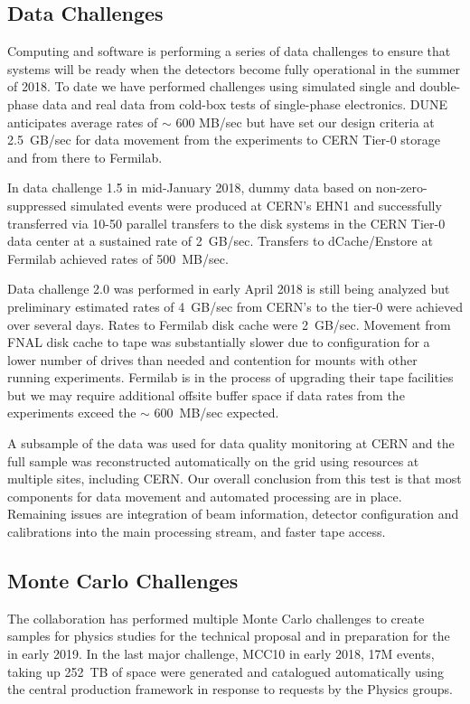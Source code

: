 \subsection{Data Challenges}

Computing and software is performing a series of data challenges to ensure that systems will be ready when the detectors become fully operational in the summer of 2018.  To date we have performed challenges using simulated single and double-phase data and real data from cold-box tests of single-phase electronics.   DUNE anticipates average rates of $\sim$ 600 MB/sec but have set our design criteria at 2.5~GB/sec for data movement from the experiments to CERN Tier-0 storage and from there to Fermilab. 

In data challenge 1.5 in mid-January 2018, dummy data based on non-zero-suppressed simulated events were produced at CERN's EHN1 and successfully transferred via 10-50 parallel transfers to the  disk systems in the CERN Tier-0 data center at a sustained rate of 2~GB/sec.    Transfers to dCache/Enstore at Fermilab achieved rates of 500~MB/sec.  

Data challenge 2.0 was performed in early April 2018 is still being analyzed but preliminary estimated  rates of 4~GB/sec from CERN's   to the tier-0 were achieved over several days. Rates to Fermilab disk cache were 2~GB/sec.  Movement from FNAL disk cache to tape was substantially slower due to configuration for a lower number of drives than needed and contention for mounts with other running experiments.   Fermilab is in the process of upgrading their tape facilities but we may require additional offsite buffer space if data rates from the experiments exceed the $\sim$ 600~MB/sec expected. 

A subsample of the data was used for data quality monitoring at CERN and the full sample was reconstructed automatically on the grid using resources at multiple sites, including CERN. 
Our overall conclusion from this test is that most components for data movement and automated processing are in place.  Remaining issues are integration of beam information, detector configuration and calibrations into the main processing stream, and faster tape access. 

\subsection{Monte Carlo Challenges}
The collaboration has performed multiple Monte Carlo challenges to create samples for physics studies for the technical proposal and in preparation for the  in early 2019.  In the last major challenge,  MCC10 in early 2018, 17M events, taking up 252~TB of space were generated and catalogued automatically using the central  production framework in response to requests by the Physics groups. 

